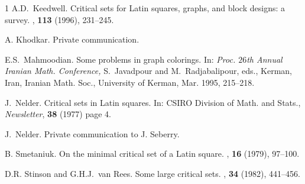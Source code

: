 \documentclass[12pt]{article}
\begin{document}
\begin{thebibliography}{1}
{\sc A.D.\ Keedwell}.
\newblock Critical sets for Latin squares, graphs, and block designs: a survey.
, {\bf 113} (1996), 231--245.

{\sc A. Khodkar}.
\newblock Private communication.

{\sc  E.S.~Mahmoodian}.
\newblock Some problems in graph colorings. In:
  {\it Proc. $26$th Annual Iranian Math. Conference,}
  S.~Javadpour and M.~Radjabalipour, eds.,
  Kerman, Iran, Iranian Math. Soc., University of Kerman, Mar. 1995,
  215--218.

{\sc J.~Nelder}.
\newblock Critical sets in Latin squares.
\newblock In: CSIRO Division of Math. and Stats., {\em Newsletter},
{\bf 38} (1977) page 4.

{\sc J.~Nelder}.
Private communication to J. Seberry.

%
{\sc B. Smetaniuk}.
\newblock On the minimal critical set of a {L}atin square.
,  {\bf 16} (1979), 97--100.

{\sc D.R. Stinson and G.H.J.~van Rees}.
\newblock Some large critical sets.
, {\bf 34} (1982), 441--456.


\end{thebibliography}
\end{document}
